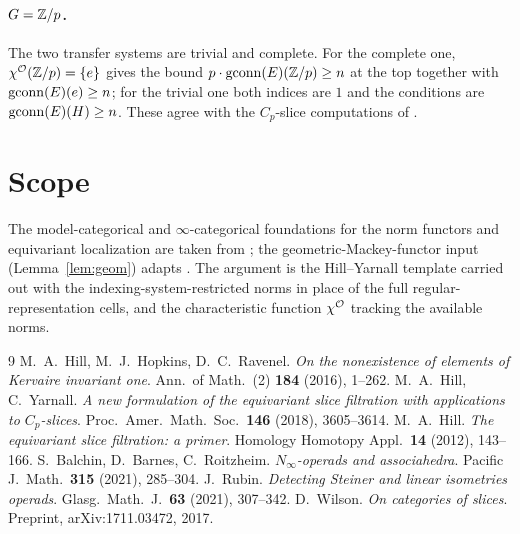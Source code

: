 \documentclass[11pt]{article}
\begin{document}
\paragraph{$G=\mathbb{Z}/p$.} The two transfer systems are trivial and complete. For the
complete one, $\chi^{\mathcal{O}}(\mathbb{Z}/p)=\{e\}$ gives the bound $p\cdot\operatorname{gconn}(E)(\mathbb{Z}/p)\ge n$
at the top together with $\operatorname{gconn}(E)(e)\ge n$; for the trivial one both indices
are $1$ and the conditions are $\operatorname{gconn}(E)(H)\ge n$. These agree with the
$C_p$-slice computations of \cite{HY18}.

\section*{Scope}

The model-categorical and $\infty$-categorical foundations for the
norm functors and equivariant localization are taken from \cite{HHR16, BBR,
Rubin}; the geometric-Mackey-functor input (Lemma~\ref{lem:geom}) adapts
\cite[\S6]{HillPrimer}. The argument is the Hill--Yarnall template
\cite{HY18} carried out with the indexing-system-restricted norms in place of
the full regular-representation cells, and the characteristic function
$\chi^{\mathcal{O}}$ tracking the available norms.

\begin{thebibliography}{9}
 M.~A.~Hill, M.~J.~Hopkins, D.~C.~Ravenel.
  \emph{On the nonexistence of elements of Kervaire invariant one}.
  Ann.\ of Math.\ (2) \textbf{184} (2016), 1--262.
 M.~A.~Hill, C.~Yarnall.
  \emph{A new formulation of the equivariant slice filtration with applications
  to $C_p$-slices}. Proc.\ Amer.\ Math.\ Soc.\ \textbf{146} (2018), 3605--3614.
 M.~A.~Hill.
  \emph{The equivariant slice filtration: a primer}.
  Homology Homotopy Appl.\ \textbf{14} (2012), 143--166.
 S.~Balchin, D.~Barnes, C.~Roitzheim.
  \emph{$N_\infty$-operads and associahedra}.
  Pacific J.\ Math.\ \textbf{315} (2021), 285--304.
 J.~Rubin.
  \emph{Detecting Steiner and linear isometries operads}.
  Glasg.\ Math.\ J.\ \textbf{63} (2021), 307--342.
 D.~Wilson.
  \emph{On categories of slices}. Preprint, arXiv:1711.03472, 2017.
\end{thebibliography}

\endgroup

\clearpage
\end{document}
